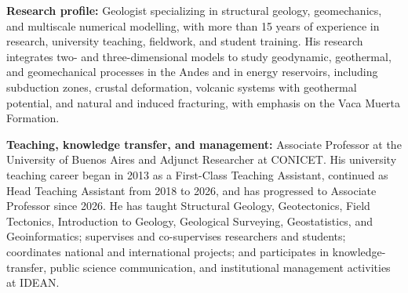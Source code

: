 
\begin{cvparagraph}

\textbf{Research profile:} Geologist specializing in structural geology, geomechanics, and multiscale numerical modelling, with more than 15 years of experience in research, university teaching, fieldwork, and student training. His research integrates two- and three-dimensional models to study geodynamic, geothermal, and geomechanical processes in the Andes and in energy reservoirs, including subduction zones, crustal deformation, volcanic systems with geothermal potential, and natural and induced fracturing, with emphasis on the Vaca Muerta Formation.

\textbf{Teaching, knowledge transfer, and management:} Associate Professor at the University of Buenos Aires and Adjunct Researcher at CONICET. His university teaching career began in 2013 as a First-Class Teaching Assistant, continued as Head Teaching Assistant from 2018 to 2026, and has progressed to Associate Professor since 2026. He has taught Structural Geology, Geotectonics, Field Tectonics, Introduction to Geology, Geological Surveying, Geostatistics, and Geoinformatics; supervises and co-supervises researchers and students; coordinates national and international projects; and participates in knowledge-transfer, public science communication, and institutional management activities at IDEAN.

\end{cvparagraph}

